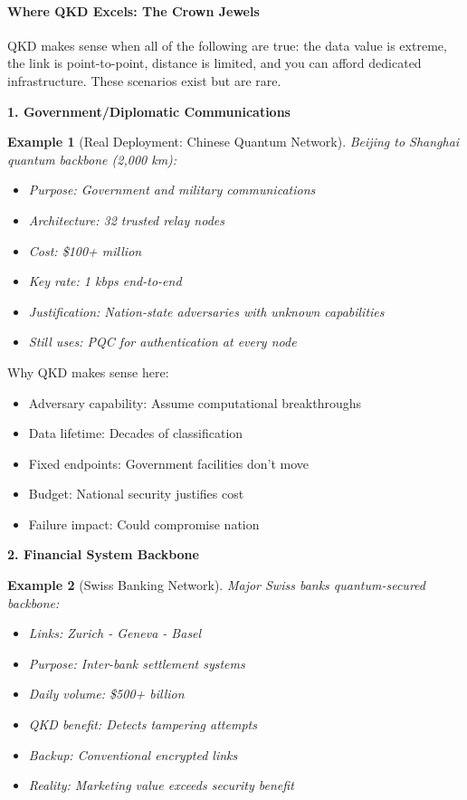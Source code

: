 \documentclass[11pt,a4paper]{article}
\newtheorem{example}{Example}
\begin{document}
\paragraph{Where QKD Excels: The Crown Jewels}

QKD makes sense when all of the following are true: the data value is extreme, the link is point-to-point, distance is limited, and you can afford dedicated infrastructure. These scenarios exist but are rare.

\textbf{1. Government/Diplomatic Communications}

\begin{example}[Real Deployment: Chinese Quantum Network]
Beijing to Shanghai quantum backbone (2,000 km):
\begin{itemize}
    \item Purpose: Government and military communications
    \item Architecture: 32 trusted relay nodes
    \item Cost: \$100+ million
    \item Key rate: 1 kbps end-to-end
    \item Justification: Nation-state adversaries with unknown capabilities
    \item Still uses: PQC for authentication at every node
\end{itemize}
\end{example}

Why QKD makes sense here:
\begin{itemize}
    \item Adversary capability: Assume computational breakthroughs
    \item Data lifetime: Decades of classification
    \item Fixed endpoints: Government facilities don't move
    \item Budget: National security justifies cost
    \item Failure impact: Could compromise nation
\end{itemize}

\textbf{2. Financial System Backbone}

\begin{example}[Swiss Banking Network]
Major Swiss banks quantum-secured backbone:
\begin{itemize}
    \item Links: Zurich - Geneva - Basel
    \item Purpose: Inter-bank settlement systems
    \item Daily volume: \$500+ billion
    \item QKD benefit: Detects tampering attempts
    \item Backup: Conventional encrypted links
    \item Reality: Marketing value exceeds security benefit
\end{itemize}
\end{example}
\end{document}
